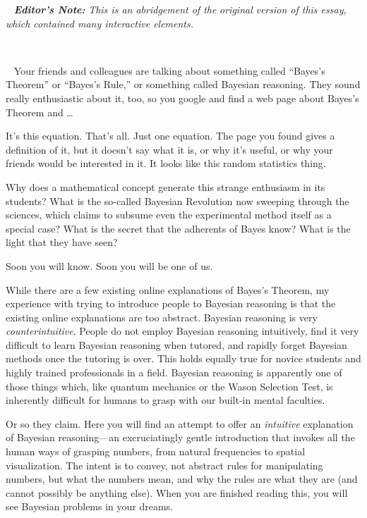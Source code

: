 
{
\ \textit{ }\textbf{\textit{Editor's
Note:}}\textit{ This is an abridgement of the
}\textit{original}\textit{ version of this essay, which contained many
interactive elements.}}

{
\textit{ ~}}

{
\textit{\ } Your friends and colleagues are talking about something
called ``Bayes's
Theorem'' or
``Bayes's Rule,'' or
something called Bayesian reasoning. They sound really enthusiastic
about it, too, so you google and find a web page about
Bayes's Theorem and \ldots}

{
 It's this equation. That's all.
Just one equation. The page you found gives a definition of it, but it
doesn't say what it is, or why it's
useful, or why your friends would be interested in it. It looks like
this random statistics thing.}

{
 Why does a mathematical concept generate this strange enthusiasm
in its students? What is the so-called Bayesian Revolution now sweeping
through the sciences, which claims to subsume even the experimental
method itself as a special case? What is the secret that the adherents
of Bayes know? What is the light that they have seen?}

{
 Soon you will know. Soon you will be one of us.}

{
 While there are a few existing online explanations of
Bayes's Theorem, my experience with trying to introduce
people to Bayesian reasoning is that the existing online explanations
are too abstract. Bayesian reasoning is very \textit{counterintuitive}.
People do not employ Bayesian reasoning intuitively, find it very
difficult to learn Bayesian reasoning when tutored, and rapidly forget
Bayesian methods once the tutoring is over. This holds equally true for
novice students and highly trained professionals in a field. Bayesian
reasoning is apparently one of those things which, like quantum
mechanics or the Wason Selection Test, is inherently difficult for
humans to grasp with our built-in mental faculties.}

{
 Or so they claim. Here you will find an attempt to offer an
\textit{intuitive} explanation of Bayesian reasoning---an
excruciatingly gentle introduction that invokes all the human ways of
grasping numbers, from natural frequencies to spatial visualization.
The intent is to convey, not abstract rules for manipulating numbers,
but what the numbers mean, and why the rules are what they are (and
cannot possibly be anything else). When you are finished reading this,
you will see Bayesian problems in your dreams.}


